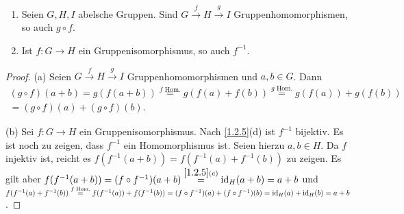\documentclass[../../main.tex]{subfiles}
\begin{document}
\begin{pro}\label{2.2.14}
\begin{enumerate}[\rm(a)]
\item Seien $G,H,I$ abelsche Gruppen. Sind $G\overset{f} \rightarrow H\overset{g}\rightarrow I$ Gruppenhomomorphismen, so auch $g\circ f$.
\item Ist $f:G\rightarrow H$ ein Gruppenisomorphismus, so auch $f^{-1}$.
\end{enumerate}
\end{pro}
\begin{proof}
(a)
Seien $G\overset{f} \rightarrow H\overset{g}\rightarrow I$ Gruppenhomomorphismen und $a,b\in G$. Dann
\begin{multline*}
(g\circ f)(a+b)=g(f(a+b))\overset{f\text{ Hom.}}=g(f(a)+f(b))
\overset{g\text{ Hom.}}=g(f(a)) + g(f(b))\\= (g\circ f)(a)+(g\circ f)(b).
\end{multline*}

(b) Sei $f:G\rightarrow H$ ein Gruppenisomorphismus. Nach \ref{1.2.5}(d) ist $f^{-1}$ bijektiv. Es ist noch zu zeigen, dass $f^{-1}$ ein Homomorphismus ist. Seien hierzu $a,b\in H$. Da $f$ injektiv ist, reicht es
 $f(f^{-1}(a+b))=f(f^{-1}(a)+f^{-1}(b))$ zu zeigen. Es gilt aber
$f(f^{-1}(a+b))=(f\circ f^{-1})(a+b)\overset{\ref{1.2.5}(c)}=\operatorname{id}_H(a+b)=a+b$
und $f(f^{-1}(a)+f^{-1}(b)) \overset{f\text{ Hom.}}= f(f^{-1}(a))+f(f^{-1}(b))
=(f\circ f^{-1})(a)+(f\circ f^{-1})(b)=\operatorname{id}_H(a)+\operatorname{id}_H(b)=a+b$.
\end{proof}

\end{document}
